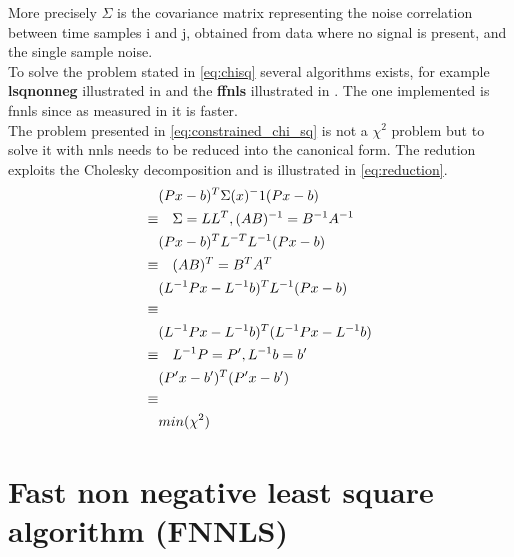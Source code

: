 More precisely $\Sigma$ is the covariance matrix representing the noise correlation between time samples i and j, obtained from data where no signal is present, and the single sample noise.\\
To solve the problem stated in \ref{eq:chisq} several algorithms exists, for example \textbf{lsqnonneg} illustrated in \cite{nnls} and the \textbf{ffnls} illustrated in \cite{fnnls}. The one implemented is fnnls since as measured in \cite{Chen09nonnegativityconstraints} it is faster.\\
The problem presented in \ref{eq:constrained_chi_sq} is not a $\chi^2$ problem but to solve it with nnls needs to be reduced into the canonical form. The redution exploits the Cholesky decomposition and is illustrated in \ref{eq:reduction}.
\begin{equation}\label{eq:reduction}
  \begin{split}
  & (Px-b)^T\Sigma(x)^-1(Px-b)\\
  \equiv &\quad \Sigma=LL^T,\space (AB)^{-1} = B^{-1} A^{-1}\\
  & (Px-b)^T L^{-T} L^{-1} (Px-b)\\
  \equiv &\quad (AB)^T = B^T A^T \\
  & (L^{-1}Px-L^{-1}b)^T  L^{-1} (Px-b)\\
  \equiv & \\
  & (L^{-1}Px-L^{-1}b)^T (L^{-1}Px-L^{-1}b)\\
  \equiv &\quad L^{-1}P=P', \space L^{-1}b=b' \\
  & (P'x-b')^T(P'x-b')\\
  \equiv & \\
  & min(\chi^2)
  \end{split}
\end{equation}

\section{Fast non negative least square algorithm (FNNLS)}

